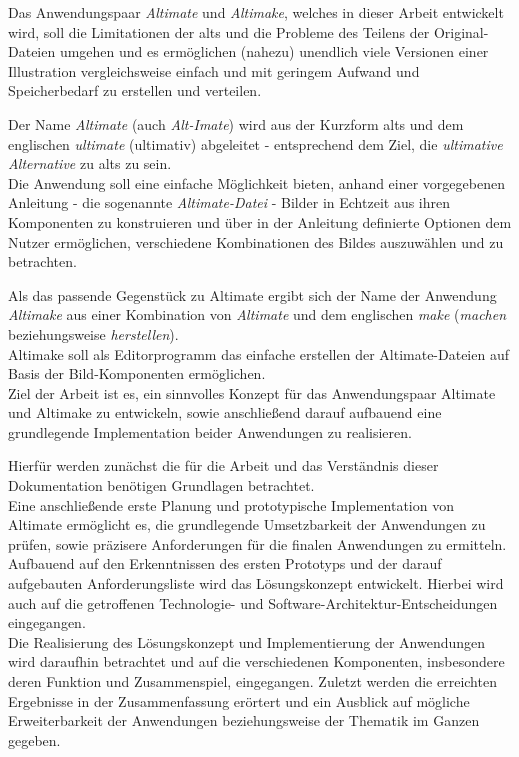 \documentclass[oneside]{ausarbeitung}
\begin{document}
Das Anwendungspaar \textit{Altimate} und \textit{Altimake}, welches in dieser Arbeit entwickelt wird, soll die Limitationen der \ac{alts} und die Probleme des Teilens der Original-Dateien umgehen und es ermöglichen (nahezu) unendlich viele Versionen einer Illustration vergleichsweise einfach und mit geringem Aufwand und Speicherbedarf zu erstellen und verteilen.

Der Name \textit{Altimate} (auch \textit{Alt-Imate}) wird aus der Kurzform \ac{alts} und dem englischen \textit{ultimate} (ultimativ) abgeleitet - entsprechend dem Ziel, die \textit{ultimative Alternative} zu \ac{alts} zu sein.\\
Die Anwendung soll eine einfache Möglichkeit bieten, anhand einer vorgegebenen Anleitung - die sogenannte \textit{Altimate-Datei} - Bilder in Echtzeit aus ihren Komponenten zu konstruieren und über in der Anleitung definierte Optionen dem Nutzer ermöglichen, verschiedene Kombinationen des Bildes auszuwählen und zu betrachten.

Als das passende Gegenstück zu Altimate ergibt sich der Name der Anwendung \textit{Altimake} aus einer Kombination von \textit{Altimate} und dem englischen \textit{make} (\textit{machen} beziehungsweise \textit{herstellen}).\\
Altimake soll als Editorprogramm das einfache erstellen der Altimate-Dateien auf Basis der Bild-Komponenten ermöglichen.\\





Ziel der Arbeit ist es, ein sinnvolles Konzept für das Anwendungspaar Altimate und Altimake zu entwickeln, sowie anschließend darauf aufbauend eine grundlegende Implementation beider Anwendungen zu realisieren.

Hierfür werden zunächst die für die Arbeit und das Verständnis dieser Dokumentation benötigen Grundlagen betrachtet.\\
Eine anschließende erste Planung und prototypische Implementation von Altimate ermöglicht es, die grundlegende Umsetzbarkeit der Anwendungen zu prüfen, sowie präzisere Anforderungen für die finalen Anwendungen zu ermitteln.\\
Aufbauend auf den Erkenntnissen des ersten Prototyps und der darauf aufgebauten Anforderungsliste wird das Lösungskonzept entwickelt. Hierbei wird auch auf die getroffenen Technologie- und Software-Architektur-Entscheidungen eingegangen.\\
Die Realisierung des Lösungskonzept und Implementierung der Anwendungen wird daraufhin betrachtet und auf die verschiedenen Komponenten, insbesondere deren Funktion und Zusammenspiel, eingegangen.
Zuletzt werden die erreichten Ergebnisse in der Zusammenfassung erörtert und ein Ausblick auf mögliche Erweiterbarkeit der Anwendungen beziehungsweise der Thematik im Ganzen gegeben.
\end{document}
